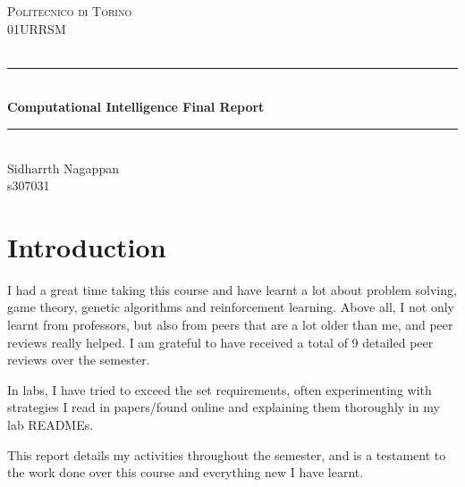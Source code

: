 \documentclass[12pt]{article}
\begin{document}
\begin{titlepage}

\newcommand{\HRule}{\rule{\linewidth}{0.5mm}} 							%
\center 
 
\textsc{\LARGE Politecnico di Torino}\\[1cm]

\textsc{\Large 01URRSM}\\[0.2cm]
\textsc{\large }\\[1cm] 										%
\HRule \\[0.8cm]
{ \huge \bfseries Computational Intelligence Final Report}\\[0.7cm]								%
\HRule \\[2cm]
\Large
Sidharrth Nagappan\\[0.5cm] 										%
s307031

\vfill 
\end{titlepage}

\tableofcontents

\newpage


\section{Introduction}

\large

I had a great time taking this course and have learnt a lot about problem solving, game theory, genetic algorithms and reinforcement learning. Above all, I not only learnt from professors, but also from peers that are a lot older than me, and peer reviews really helped. I am grateful to have received a total of 9 detailed peer reviews over the semester.

In labs, I have tried to exceed the set requirements, often
experimenting with strategies I read in papers/found online and explaining them thoroughly in my lab READMEs.

This report details my activities throughout the semester, and is a testament to the work done over this course and everything new I have learnt.
\end{document}
